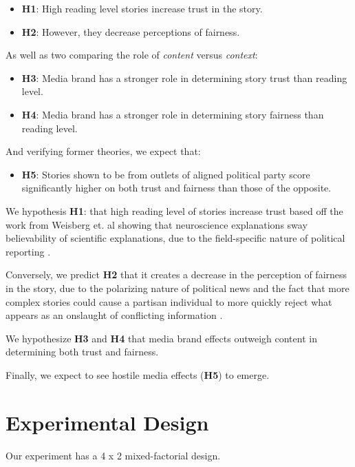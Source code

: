 \begin{itemize}
\item \textbf{H1}: High reading level stories increase trust in the story.
\item \textbf{H2}: However, they decrease perceptions of fairness. 
\end{itemize}

As well as two comparing the role of \emph{content} versus \emph{context}:

\begin{itemize}
\item \textbf{H3}: Media brand has a stronger role in determining story trust than reading level. 
\item \textbf{H4}: Media brand has a stronger role in determining story fairness than reading level.
\end{itemize}

And verifying former theories, we expect that:
\begin{itemize}
\item \textbf{H5}: Stories shown to be from outlets of aligned political party score significantly higher on both trust and fairness than those of the opposite.
\end{itemize}

We hypothesis \textbf{H1}: that high reading level of stories increase trust based off the work from Weisberg et. al showing that neuroscience explanations sway believability of scientific explanations, due to the field-specific nature of political reporting \cite{weisberg2008seductive}.

Conversely, we predict \textbf{H2} that it creates a decrease in the perception of fairness in the story, due to the polarizing nature of political news and the fact that more complex stories could cause a partisan individual to more quickly reject what appears as an onslaught of conflicting information \cite{cacioppo1979effects}.
 
 We hypothesize \textbf{H3} and \textbf{H4} that media brand effects outweigh content in determining both trust and fairness.

 Finally, we expect to see hostile media effects (\textbf{H5}) to emerge.

\section{Experimental Design}
Our experiment has a 4 x 2 mixed-factorial design.
 
